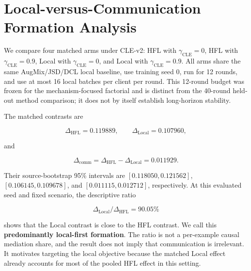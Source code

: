 \section{Local-versus-Communication Formation Analysis}

We compare four matched arms under CLE-v2: HFL with \(\gamma_{\mathrm{CLE}}=0\), HFL with \(\gamma_{\mathrm{CLE}}=0.9\), Local with \(\gamma_{\mathrm{CLE}}=0\), and Local with \(\gamma_{\mathrm{CLE}}=0.9\). All arms share the same AugMix/JSD/DCL local baseline, use training seed 0, run for 12 rounds, and use at most 16 local batches per client per round. This 12-round budget was frozen for the mechanism-focused factorial and is distinct from the 40-round held-out method comparison; it does not by itself establish long-horizon stability.

\begin{table}[t]
\centering
\small
\caption{CLE formation and matched local-first attribution. Source-bootstrap intervals condition on the trained checkpoints.}
\label{tab:auto1}
\end{table}

The matched contrasts are

\[
\Delta_{\mathrm{HFL}}=0.119889,\qquad
\Delta_{\mathrm{Local}}=0.107960,
\]

and

\[
\Delta_{\mathrm{comm}}
=\Delta_{\mathrm{HFL}}-\Delta_{\mathrm{Local}}
=0.011929.
\]

Their source-bootstrap 95\% intervals are \([0.118050,0.121562]\), \([0.106145,0.109678]\), and \([0.011115,0.012712]\), respectively. At this evaluated seed and fixed scenario, the descriptive ratio

\[
\Delta_{\mathrm{Local}}/\Delta_{\mathrm{HFL}}=90.05\%
\]

shows that the Local contrast is close to the HFL contrast. We call this \textbf{predominantly local-first formation}. The ratio is not a per-example causal mediation share, and the result does not imply that communication is irrelevant. It motivates targeting the local objective because the matched Local effect already accounts for most of the pooled HFL effect in this setting.

